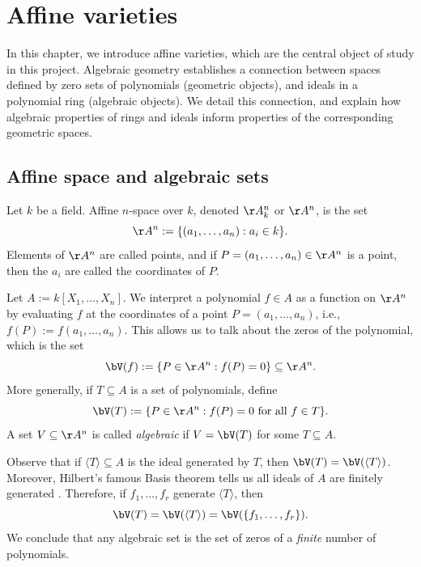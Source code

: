 \documentclass[12pt]{amsart}
\theoremstyle{plain}
\begin{document}
\newpage
\section{Affine varieties}
In this chapter, we introduce affine varieties, which are the central object of study in this project.
Algebraic geometry establishes a connection between spaces defined by zero sets of polynomials (geometric objects), and ideals in a polynomial ring (algebraic objects).
We detail this connection, and explain how algebraic properties of rings and ideals inform properties of the corresponding geometric spaces.

\subsection{Affine space and algebraic sets}
Let $k$ be a field.
Affine $n$-space over $k$, denoted $\AA^n_k$ or $\AA^n$, is the set 
$$\AA^n := \{(a_1, \ldots, a_n) : a_i \in k\}.$$
Elements of $\AA^n$ are called points, and if $P = (a_1, \ldots, a_n) \in \AA^n$ is a point, then the $a_i$ are called the coordinates of $P$.

Let $A := k[X_1, \ldots, X_n]$.
We interpret a polynomial $f \in A$ as a function on $\AA^n$ by evaluating $f$ at the coordinates of a point $P = (a_1, \ldots, a_n)$, i.e., $f(P) := f(a_1, \ldots, a_n).$
This allows us to talk about the zeros of the polynomial, which is the set
$$\bV(f) := \{P \in \AA^n : f(P) = 0\} \subseteq \AA^n.$$
More generally, if $T \subseteq A$ is a set of polynomials, define
$$\bV(T) := \{P \in \AA^n : f(P) = 0 \text{ for all } f \in T\}.$$
A set $V \subseteq \AA^n$ is called \emph{algebraic} if $V = \bV(T)$ for some $T \subseteq A$.

Observe that if $\langle T \rangle \subseteq A$ is the ideal generated by $T$, then $\bV(T) = \bV(\langle T \rangle)$.
Moreover, Hilbert's famous Basis theorem tells us all ideals of $A$ are finitely generated \cite[\S 3.6]{Reid95}.
Therefore, if $f_1, \ldots, f_r$ generate $\langle T \rangle$, then 
$$\bV(T) = \bV(\langle T \rangle) = \bV(\{f_1, \ldots, f_r\}).$$
We conclude that any algebraic set is the set of zeros of a \emph{finite} number of polynomials.
\end{document}
